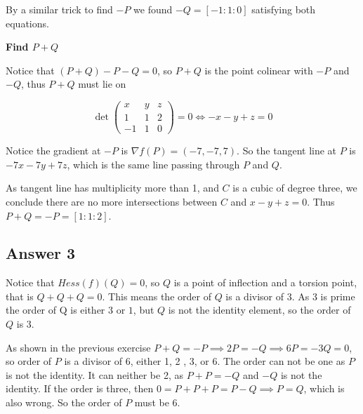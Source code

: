 \documentclass{article}
\theoremstyle{definition}
\theoremstyle{definition}
\theoremstyle{remark}
\begin{document}
By a similar trick to find $-P$ we found $-Q = [-1: 1: 0]$ satisfying both equations.

\textbf{Find $P + Q$}

Notice that $(P + Q) -P - Q = 0$, so $P + Q$ is the point colinear with $-P$ and $-Q$, thus $P + Q$ must lie on 

\begin{equation}
	\det \begin{pmatrix}
		x & y & z \\
		1 & 1 & 2 \\
		-1 & 1 & 0
	\end{pmatrix} = 0 \iff -x - y + z = 0
\end{equation}

Notice the gradient at $-P$ is $\nabla f(P) = (-7, -7, 7)$.
So the tangent line at $P$ is $-7x - 7y + 7z$, which is the same line passing through $P$ and $Q$.

As tangent line has multiplicity more than 1, and $C$ is a cubic of degree three, we conclude there are no more intersections between $C$ and $x - y + z =0$.
Thus $P + Q = -P = [1: 1: 2]$.

\subsection*{Answer 3}

Notice that $Hess(f)(Q) = 0$, so $Q$ is a point of inflection and a torsion point, that is $Q + Q + Q = 0$. 
This means the order of $Q$ is a divisor of 3. 
As 3 is prime the order of Q is either $3$ or $1$, but $Q$ is not the identity element, so the order of $Q$ is 3.

As shown in the previous exercise $P + Q = -P \implies 2P = -Q \implies 6 P = -3 Q = 0$, so order of $P$ is a divisor of $6$, either 1, 2 , 3, or 6.
The order can not be one as $P$ is not the identity. 
It can neither be 2, as $P + P = -Q$ and $-Q$ is not the identity.
If the order is three, then $0 = P +  P + P = P - Q \implies P = Q $, which is also wrong. 
So the order of $P$ must be 6.
\end{document}
